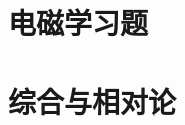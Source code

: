 \documentclass[12pt, a4paper, openany]{book}
\begin{document}
\part{电磁学习题}







\part{综合与相对论}




\appendix





\printindex
\end{document}
